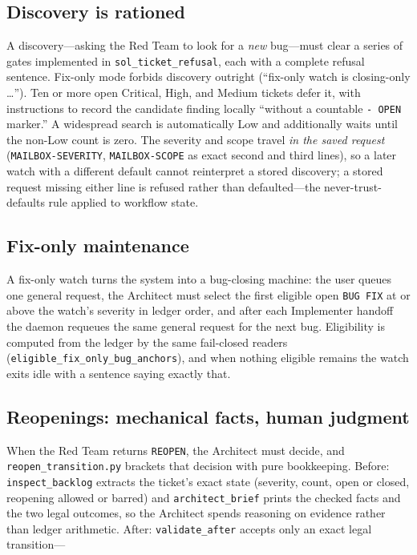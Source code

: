 \documentclass[10pt,aps,prd,twocolumn,nofootinbib]{revtex4-2}
\newcommand{\code}[1]{\texttt{#1}}
\newcommand{\file}[1]{\texttt{#1}}
\begin{document}
\subsection{Discovery is rationed}

A discovery---asking the Red Team to look for a \emph{new} bug---must
clear a series of gates implemented in \code{sol\_ticket\_refusal},
each with a complete refusal sentence.  Fix-only mode forbids
discovery outright (``fix-only watch is closing-only \dots'').  Ten or
more open Critical, High, and Medium tickets defer it, with
instructions to record the candidate finding locally ``without a
countable \code{- OPEN} marker.''  A widespread search is
automatically Low and additionally waits until the non-Low count is
zero.  The severity and scope travel \emph{in the saved request}
(\code{MAILBOX-SEVERITY}, \code{MAILBOX-SCOPE} as exact second and
third lines), so a later watch with a different default cannot
reinterpret a stored discovery; a stored request missing either line
is refused rather than defaulted---the never-trust-defaults rule
applied to workflow state.

\subsection{Fix-only maintenance}

A fix-only watch turns the system into a bug-closing machine: the
user queues one general request, the Architect must select the first
eligible open \code{BUG FIX} at or above the watch's severity in
ledger order, and after each Implementer handoff the daemon requeues
the same general request for the next bug.  Eligibility is computed
from the ledger by the same fail-closed readers
(\code{eligible\_fix\_only\_bug\_anchors}), and when nothing eligible
remains the watch exits idle with a sentence saying exactly that.

\subsection{Reopenings: mechanical facts, human judgment}

When the Red Team returns \code{REOPEN}, the Architect must decide,
and \file{reopen\_transition.py} brackets that decision with pure
bookkeeping.  Before: \code{inspect\_backlog} extracts the ticket's
exact state (severity, count, open or closed, reopening allowed or
barred) and \code{architect\_brief} prints the checked facts and the
two legal outcomes, so the Architect spends reasoning on evidence
rather than ledger arithmetic.  After: \code{validate\_after} accepts
only an exact legal transition---
\end{document}

